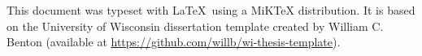 This document was typeset with \LaTeX \ using a MiKTeX distribution. It is based on the University of Wisconsin dissertation template created by William C. Benton (available at \url{https://github.com/willb/wi-thesis-template}).
 
